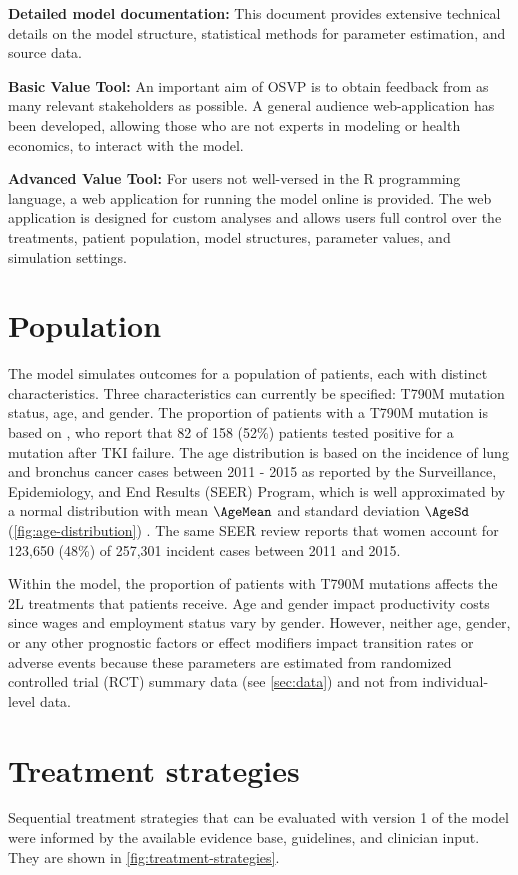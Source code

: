\documentclass[11pt,final,fleqn]{article}\usepackage[]{graphicx}\usepackage[]{color}
\theoremstyle{plain}
\newcommand\R{{\textsf{R}}}
\begin{document}
{\textbf{Detailed model documentation:} This document provides extensive technical details on the model structure, statistical methods for parameter estimation, and source data.

\textbf{Basic Value Tool:} An important aim of OSVP is to obtain feedback from as many relevant stakeholders as possible. A general audience web-application has been developed, allowing those who are not experts in modeling or health economics, to interact with the model.

\textbf{Advanced Value Tool:} For users not well-versed in the \R{} programming language, a web application for running the model online is provided. The web application is designed for custom analyses and allows users full control over the treatments, patient population, model structures, parameter values, and simulation settings.

\section{Population}\label{sec:population}
The model simulates outcomes for a population of patients, each with distinct characteristics. Three characteristics can currently be specified: T790M mutation status, age, and gender. The proportion of patients with a T790M mutation is based on \citet{ma2011t790m}, who report that 82 of 158 (52\%) patients tested positive for a mutation after TKI failure. The age distribution is based on the incidence of lung and bronchus cancer cases between 2011 - 2015 as reported by the Surveillance, Epidemiology, and End Results (SEER) Program, which is well approximated by a normal distribution with mean $\AgeMean$ and standard deviation $\AgeSd$ (\autoref{fig:age-distribution}) \citep{noone2018seer}. The same SEER review reports that women account for 123,650 (48\%) of 257,301 incident cases between 2011 and 2015. 

Within the model, the proportion of patients with T790M mutations affects the 2L treatments that patients receive. Age and gender impact productivity costs since wages and employment status vary by gender. However, neither age, gender, or any other prognostic factors or effect modifiers impact transition rates or adverse events because these parameters are estimated from randomized controlled trial (RCT) summary data (see \autoref{sec:data}) and not from individual-level data.

\section{Treatment strategies}\label{sec:treatments}
Sequential treatment strategies that can be evaluated with version 1 of the model were informed by the available evidence base, guidelines, and clinician input. They are shown in \autoref{fig:treatment-strategies}. 

}
\end{document}
